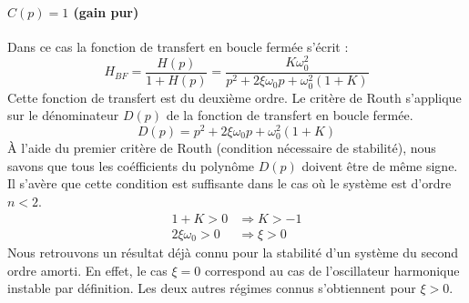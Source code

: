 \paragraph{$C(p)=1$ (gain pur)}
Dans ce cas la fonction de transfert en boucle fermée s'écrit :
\[
H_{BF}=
\dfrac{H(p)}{1+H(p)}=
\dfrac{K\omega_0^2}{p^2+2\xi\omega_0p+\omega_0^2(1+K)}
\]
Cette fonction de transfert est du deuxième ordre.
Le critère de Routh s'applique sur le dénominateur $D(p)$ de la fonction de 
transfert en boucle fermée.
\[
D(p)=p^2+2\xi\omega_0p+\omega_0^2(1+K)
\]
\`A l'aide du premier critère de Routh (condition nécessaire de stabilité), nous
savons que tous les coéfficients du polynôme $D(p)$ doivent être de même signe.
Il s'avère que cette condition est suffisante dans le cas où le système est 
d'ordre $n<2$.
\begin{align*}
    1+K>0 &\Rightarrow K > -1\\
    2\xi\omega_0 > 0 &\Rightarrow \xi> 0
\end{align*}
Nous retrouvons un résultat déjà connu pour la stabilité d'un système du 
second ordre amorti. En effet, le cas $\xi=0$ correspond au cas de l'oscillateur
harmonique instable par définition. Les deux autres régimes connus s'obtiennent 
pour $\xi>0$.
